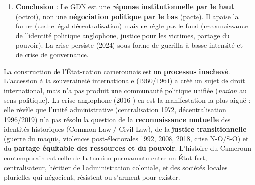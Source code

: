 \documentclass[11pt]{article}
\newcounter{popsec}
\newcounter{popsub}
\newcommand{\courssub}[1]{%
  \stepcounter{popsub}%
  \par\vspace{9pt}\noindent{\popxbold\fontsize{11.5}{13}\selectfont\color{popink}{\color{poporange}\thepopsec.\thepopsub}\hspace{6pt}#1}\par\nopagebreak\vspace{4pt}
}
\begin{document}
\begin{exoresolu}
\begin{enumerate}
\begin{itemize}
        \item \textbf{Continuité répressive :} Parallèlement au GDN, poursuite des opérations militaires, arrestations arbitraires, lois antiterroristes (2014) utilisées contre opposants politiques/journalistes.
        \item \textbf{Application lente :} Élections régionales (2020) boycottées par l'opposition majeure (MRC). Transferts financiers effectifs aux Régions encore partiels (2024). CNBBM sous-dotée (2 Mrds FCFA).
    \end{itemize}
    \item \textbf{Conclusion :} Le GDN est une \textbf{réponse institutionnelle par le haut} (octroi), non une \textbf{négociation politique par le bas} (pacte). Il apaise la forme (cadre légal décentralisation) mais ne règle pas le fond (reconnaissance de l'identité politique anglophone, justice pour les victimes, partage du pouvoir). La crise persiste (2024) sous forme de guérilla à basse intensité et de crise de gouvernance.
\end{enumerate}
\end{exoresolu}

\courssub{Bilan : un processus inachevé}

\begin{propriete}
La construction de l'État-nation camerounais est un \textbf{processus inachevé}. L'accession à la souveraineté internationale (1960/1961) a créé un sujet de droit international, mais n'a pas produit une communauté politique unifiée (\emph{nation} au sens politique). La crise anglophone (2016-) en est la manifestation la plus aiguë : elle révèle que l'unité administrative (centralisation 1972, décentralisation 1996/2019) n'a pas résolu la question de la \textbf{reconnaissance mutuelle} des identités historiques (Common Law / Civil Law), de la \textbf{justice transitionnelle} (guerre du maquis, violences post-électorales 1992, 2008, 2018, crise N-O/S-O) et du \textbf{partage équitable des ressources et du pouvoir}. L'histoire du Cameroun contemporain est celle de la tension permanente entre un État fort, centralisateur, héritier de l'administration coloniale, et des sociétés locales plurielles qui négocient, résistent ou s'arment pour exister.
\end{propriete}
\end{document}
